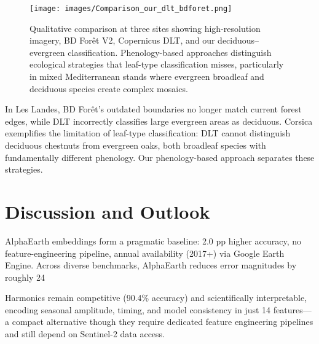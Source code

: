 \documentclass[utf8]{FrontiersinHarvard}
\begin{document}
\begin{figure}[H]
    \centering
    \texttt{[image: images/Comparison\_our\_dlt\_bdforet.png]}
    \caption{Qualitative comparison at three sites showing high-resolution imagery, BD Forêt V2, Copernicus DLT, and our deciduous–evergreen classification. Phenology-based approaches distinguish ecological strategies that leaf-type classification misses, particularly in mixed Mediterranean stands where evergreen broadleaf and deciduous species create complex mosaics.}
    \label{fig:comparison_products}
\end{figure}

In Les Landes, BD Forêt's outdated boundaries no longer match current forest edges, while DLT incorrectly classifies large evergreen areas as deciduous. Corsica exemplifies the limitation of leaf-type classification: DLT cannot distinguish deciduous chestnuts from evergreen oaks, both broadleaf species with fundamentally different phenology. Our phenology-based approach separates these strategies.

\section{Discussion and Outlook}

AlphaEarth embeddings \citep{AlphaEarth2025} form a pragmatic baseline: 2.0 pp higher accuracy, no feature-engineering pipeline, annual availability (2017+) via Google Earth Engine. Across diverse benchmarks, AlphaEarth reduces error magnitudes by roughly 24%

Harmonics remain competitive (90.4\% accuracy) and scientifically interpretable, encoding seasonal amplitude, timing, and model consistency in just 14 features—a compact alternative though they require dedicated feature engineering pipelines and still depend on Sentinel-2 data access.
\end{document}
